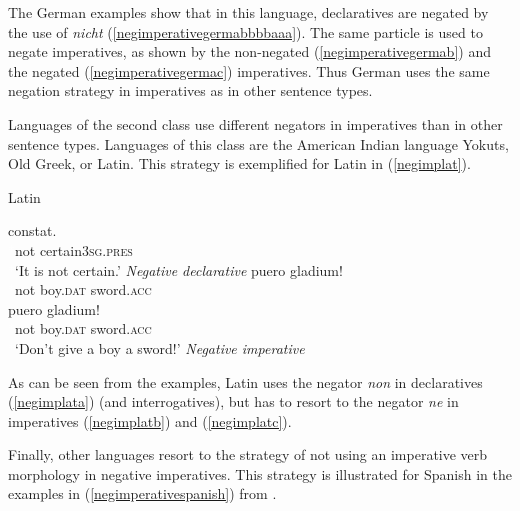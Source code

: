 \noindent The German examples show that in this language, declaratives are negated by the use of \textit{nicht} (\ref{negimperativegermabbbbaaa}). The same particle is used to negate imperatives, as shown by the non-negated (\ref{negimperativegermab}) and the negated (\ref{negimperativegermac}) imperatives. Thus German uses the same negation strategy in imperatives as in other sentence types.%

Languages of the second class use different negators in imperatives than in other sentence types. Languages of this class are the American Indian language Yokuts, Old Greek, or Latin. This strategy is exemplified for Latin in (\ref{negimplat}).

\begin{exe}
\ex Latin\label{negimplat}
\begin{xlist}
\ex {} {constat.}\\
{\textcolor{white}{*}not} {certain\textsc{3sg.pres}} \\
\trans \textcolor{white}{*}`It is not certain.' \hfill{\textit{Negative declarative}} \label{negimplata}
\ex {} {puero} {gladium!}\\
{\textcolor{white}{*}not} {boy.\textsc{dat}} {sword.\textsc{acc}} \\
\label{negimplatb}
\ex {} {puero} {gladium!}\\
{\textcolor{white}{*}not} {boy.\textsc{dat}} {sword.\textsc{acc}} \\
\trans \textcolor{white}{*}`Don't give a boy a sword!' \hfill{\textit{Negative imperative}}\label{negimplatc}

\end{xlist}
\end{exe}

\noindent As can be seen from the examples, Latin uses the negator \textit{non} in declaratives (\ref{negimplata}) (and interrogatives), but has to resort to the negator \textit{ne} in imperatives (\ref{negimplatb}) and (\ref{negimplatc}).

Finally, other languages resort to the strategy of not using an imperative verb morphology in negative imperatives. This strategy is illustrated for Spanish in the examples in (\ref{negimperativespanish}) from \citet[57--58]{van2007imperatives}.


